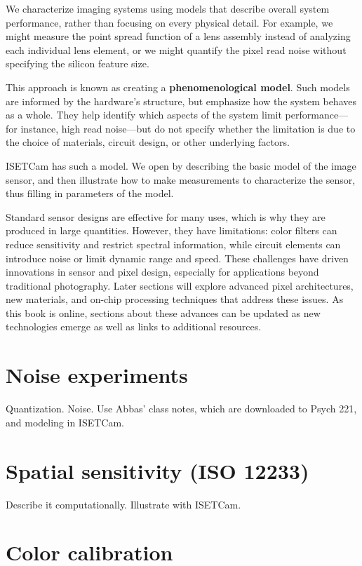 \documentclass[
  letterpaper,
]{book}
\begin{document}
We characterize imaging systems using models that describe overall
system performance, rather than focusing on every physical detail. For
example, we might measure the point spread function of a lens assembly
instead of analyzing each individual lens element, or we might quantify
the pixel read noise without specifying the silicon feature size.

This approach is known as creating a \textbf{phenomenological model}.
Such models are informed by the hardware's structure, but emphasize how
the system behaves as a whole. They help identify which aspects of the
system limit performance---for instance, high read noise---but do not
specify whether the limitation is due to the choice of materials,
circuit design, or other underlying factors.

ISETCam has such a model. We open by describing the basic model of the
image sensor, and then illustrate how to make measurements to
characterize the sensor, thus filling in parameters of the model.

Standard sensor designs are effective for many uses, which is why they
are produced in large quantities. However, they have limitations: color
filters can reduce sensitivity and restrict spectral information, while
circuit elements can introduce noise or limit dynamic range and speed.
These challenges have driven innovations in sensor and pixel design,
especially for applications beyond traditional photography. Later
sections will explore advanced pixel architectures, new materials, and
on-chip processing techniques that address these issues. As this book is
online, sections about these advances can be updated as new technologies
emerge as well as links to additional resources.

\section{Noise experiments}\label{noise-experiments}

Quantization. Noise. Use Abbas' class notes, which are downloaded to
Psych 221, and modeling in ISETCam.

\section{Spatial sensitivity (ISO
12233)}\label{spatial-sensitivity-iso-12233}

Describe it computationally. Illustrate with ISETCam.

\section{Color calibration}\label{color-calibration}
\end{document}
